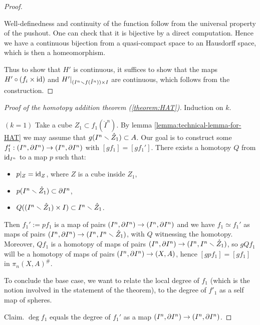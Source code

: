 \begin{proof}
\begin{claimproof}
Well-definedness and continuity of the function follow from the universal property of the pushout. One can check that it is bijective by a direct computation. Hence we have a continuous bijection from a quasi-compact space to an Hausdorff space, which is then a homeomorphism. 
\end{claimproof}

Thus to show that $H'$ is continuous, it suffices to show that the maps $H'\circ (f_i\times \operatorname{id})$ and $H'|_{(I^n\smallsetminus f(\mathring I^n))\times I}$ are continuous, which follows from the construction.
\end{proof}

\begin{proof}[Proof of the homotopy addition theorem (\ref{theorem:HAT})]\renewcommand{\qedsymbol}{\textit{To be continued...}} Induction on $k$.

$(k=1)$ Take a cube $Z_1\subset f_1(\mathring{I}^n)$. By lemma \ref{lemma:technical-lemma-for-HAT} we may assume that $g(I^n\smallsetminus\mathring{Z}_1)\subset A$. Our goal is to construct some $f_1':(I^n,\partial I^n)\to(I^n,\partial I^n)$ with $[gf_1]=[gf_1']$. There exists a homotopy $Q$ from $\operatorname{id}_{I^n}$ to a map $p$ such that:
\begin{itemize}
    \item $p|_{Z}=\operatorname{id}_{Z}$, where $Z$ is a cube inside $Z_1$,
    \item $p(I^n\smallsetminus\mathring{Z}_1)\subset\partial I^n$,
    \item $Q((I^n\smallsetminus\mathring{Z}_1)\times I)\subset I^n\smallsetminus \mathring{Z}_1$.\alvaropls
\end{itemize}
Then $f_1':= pf_1$ is a map of pairs $(I^n,\partial I^n)\to(I^n,\partial I^n)$ and we have $f_1\simeq f_1'$ as maps of pairs $(I^n,\partial I^n)\to(I^n,I^n\smallsetminus \mathring{Z}_1)$, with $Q$ witnessing the homotopy. Moreover, $Qf_1$ is a homotopy of maps of pairs $(I^n,\partial I^n)\to(I^n,I^n\smallsetminus\mathring{Z}_1)$, so $gQf_1$ will be a homotopy of maps of pairs $(I^n,\partial I^n)\to(X,A)$, hence $[gpf_1]=[gf_1]$ in $\pi_n(X,A)^\#$.

To conclude the base case, we want to relate the local degree of $f_1$ (which is the notion involved in the statement of the theorem), to the degree of $f'_1$ as a self map of spheres.

Claim. $\deg f_1$ equals the degree of $f_1'$ as a map $(I^n,\partial I^n)\to(I^n,\partial I^n)$.


\end{proof}
